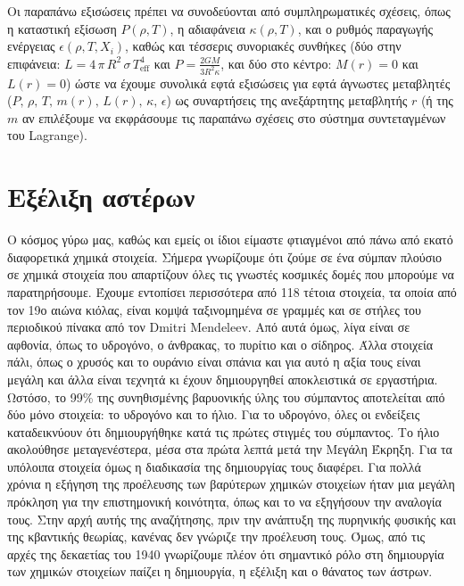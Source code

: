 Οι παραπάνω εξισώσεις πρέπει να συνοδεύονται από συμπληρωματικές σχέσεις, όπως η καταστική εξίσωση $P(\rho, T)$, η αδιαφάνεια $\kappa(\rho, T)$, και ο ρυθμός παραγωγής ενέργειας $\epsilon(\rho, T, X_i)$, καθώς και τέσσερις συνοριακές συνθήκες (δύο στην επιφάνεια: $L = 4\,\pi \,R^2 \,\sigma \,T_{\text{eff}}^4$ και $P=\frac{2GM}{3 R^2 \kappa}$, και δύο στο κέντρο: $M(r) = 0$ και $L(r) = 0$) ώστε να έχουμε συνολικά εφτά εξισώσεις για εφτά άγνωστες μεταβλητές ($P, \,\rho, \,T, \,m(r), \,L(r), \,\kappa, \,\epsilon$) ως συναρτήσεις της ανεξάρτητης μεταβλητής $r$ (ή της $m$ αν επιλέξουμε να εκφράσουμε τις παραπάνω σχέσεις στο σύστημα συντεταγμένων του Lagrange).
\section{Εξέλιξη αστέρων}
Ο κόσμος γύρω μας, καθώς και εμείς οι ίδιοι είμαστε φτιαγμένοι από πάνω από εκατό διαφορετικά χημικά στοιχεία. Σήμερα γνωρίζουμε ότι ζούμε σε ένα σύμπαν πλούσιο σε χημικά στοιχεία που απαρτίζουν όλες τις γνωστές κοσμικές δομές που μπορούμε να παρατηρήσουμε. Έχουμε εντοπίσει περισσότερα από 118 τέτοια στοιχεία, τα οποία από τον 19ο αιώνα κιόλας, είναι κομψά ταξινομημένα σε γραμμές και σε στήλες του περιοδικού πίνακα από τον Dmitri Mendeleev. Από αυτά όμως, λίγα είναι σε αφθονία, όπως το υδρογόνο, ο άνθρακας, το πυρίτιο και ο σίδηρος. Άλλα στοιχεία πάλι, όπως ο χρυσός και το ουράνιο είναι σπάνια και για αυτό η αξία τους είναι μεγάλη και άλλα είναι τεχνητά κι έχουν δημιουργηθεί αποκλειστικά σε εργαστήρια. Ωστόσο, το 99\% της συνηθισμένης βαρυονικής ύλης του σύμπαντος αποτελείται από δύο μόνο στοιχεία: το υδρογόνο και το ήλιο. Για το υδρογόνο, όλες οι ενδείξεις καταδεικνύουν ότι δημιουργήθηκε κατά τις πρώτες στιγμές του σύμπαντος. Το ήλιο ακολούθησε μεταγενέστερα, μέσα στα πρώτα λεπτά μετά την Μεγάλη Έκρηξη.
Για τα υπόλοιπα στοιχεία όμως η διαδικασία της δημιουργίας τους διαφέρει. Για πολλά χρόνια η εξήγηση της προέλευσης των βαρύτερων χημικών στοιχείων ήταν μια μεγάλη πρόκληση για την επιστημονική κοινότητα, όπως και το να εξηγήσουν την αναλογία τους. Στην αρχή αυτής της αναζήτησης, πριν την ανάπτυξη της πυρηνικής φυσικής και της κβαντικής θεωρίας, κανένας δεν γνώριζε την προέλευση τους. Όμως, από τις αρχές της δεκαετίας του 1940 γνωρίζουμε πλέον ότι σημαντικό ρόλο στη δημιουργία των χημικών στοιχείων παίζει η δημιουργία, η εξέλιξη και ο θάνατος των άστρων.  
